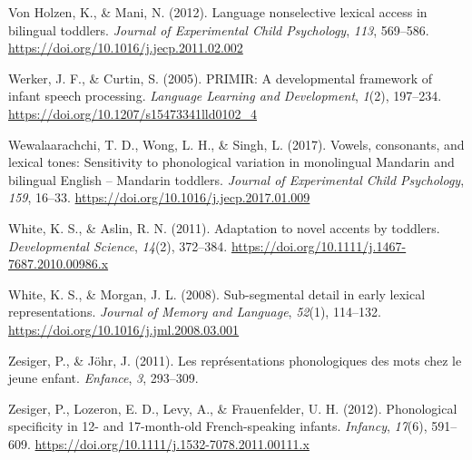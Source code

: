 \documentclass[
  english,
  man, noextraspace]{apa6}
\newlength{\cslhangindent}
\newenvironment{cslreferences}%
  {\setlength{\parindent}{0pt}%
  \everypar{\setlength{\hangindent}{\cslhangindent}}\ignorespaces}%
  {\par}
\begin{document}
\begin{cslreferences}
\leavevmode\hypertarget{ref-VonHolzen2012}{}%
Von Holzen, K., \& Mani, N. (2012). Language nonselective lexical access in bilingual toddlers. \emph{Journal of Experimental Child Psychology}, \emph{113}, 569--586. \url{https://doi.org/10.1016/j.jecp.2011.02.002}

\leavevmode\hypertarget{ref-Werker2005}{}%
Werker, J. F., \& Curtin, S. (2005). PRIMIR: A developmental framework of infant speech processing. \emph{Language Learning and Development}, \emph{1}(2), 197--234. \url{https://doi.org/10.1207/s15473341lld0102_4}

\leavevmode\hypertarget{ref-Wewalaarachchi2017}{}%
Wewalaarachchi, T. D., Wong, L. H., \& Singh, L. (2017). Vowels, consonants, and lexical tones: Sensitivity to phonological variation in monolingual Mandarin and bilingual English -- Mandarin toddlers. \emph{Journal of Experimental Child Psychology}, \emph{159}, 16--33. \url{https://doi.org/10.1016/j.jecp.2017.01.009}

\leavevmode\hypertarget{ref-White2011a}{}%
White, K. S., \& Aslin, R. N. (2011). Adaptation to novel accents by toddlers. \emph{Developmental Science}, \emph{14}(2), 372--384. \url{https://doi.org/10.1111/j.1467-7687.2010.00986.x}

\leavevmode\hypertarget{ref-White2008}{}%
White, K. S., \& Morgan, J. L. (2008). Sub-segmental detail in early lexical representations. \emph{Journal of Memory and Language}, \emph{52}(1), 114--132. \url{https://doi.org/10.1016/j.jml.2008.03.001}

\leavevmode\hypertarget{ref-Zesiger2011}{}%
Zesiger, P., \& Jöhr, J. (2011). Les représentations phonologiques des mots chez le jeune enfant. \emph{Enfance}, \emph{3}, 293--309.

\leavevmode\hypertarget{ref-Zesiger2012}{}%
Zesiger, P., Lozeron, E. D., Levy, A., \& Frauenfelder, U. H. (2012). Phonological specificity in 12- and 17-month-old French-speaking infants. \emph{Infancy}, \emph{17}(6), 591--609. \url{https://doi.org/10.1111/j.1532-7078.2011.00111.x}
\end{cslreferences}

\endgroup
\end{document}
